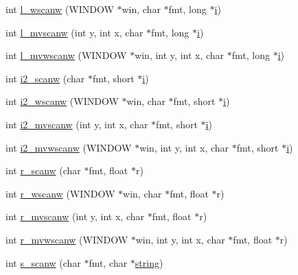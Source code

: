 \begin{DoxyCompactItemize}
\item 
int \hyperlink{C-macros_8c_ae2aa5264dfbd2042fa25e8e70bb445fe}{l\+\_\+wscanw} (W\+I\+N\+D\+OW $\ast$win, char $\ast$fmt, long $\ast$\hyperlink{intro__blas1_83_8txt_a8ba82a50c0c2c12d5f6a77f7e4651c0b}{i})
\item 
int \hyperlink{C-macros_8c_a27ab41c1f51bd6ad8029350446a577ea}{l\+\_\+mvscanw} (int y, int x, char $\ast$fmt, long $\ast$\hyperlink{intro__blas1_83_8txt_a8ba82a50c0c2c12d5f6a77f7e4651c0b}{i})
\item 
int \hyperlink{C-macros_8c_afd4ce2c83673e3073a46a6c0e05b235b}{l\+\_\+mvwscanw} (W\+I\+N\+D\+OW $\ast$win, int y, int x, char $\ast$fmt, long $\ast$\hyperlink{intro__blas1_83_8txt_a8ba82a50c0c2c12d5f6a77f7e4651c0b}{i})
\item 
int \hyperlink{C-macros_8c_ad51e0ab478b4039b3191e38e31ee0676}{i2\+\_\+scanw} (char $\ast$fmt, short $\ast$\hyperlink{intro__blas1_83_8txt_a8ba82a50c0c2c12d5f6a77f7e4651c0b}{i})
\item 
int \hyperlink{C-macros_8c_a44593e3cd853674d1c25ad8295a5e7d2}{i2\+\_\+wscanw} (W\+I\+N\+D\+OW $\ast$win, char $\ast$fmt, short $\ast$\hyperlink{intro__blas1_83_8txt_a8ba82a50c0c2c12d5f6a77f7e4651c0b}{i})
\item 
int \hyperlink{C-macros_8c_ac3ddc9a07837b44a0d66ef085f764609}{i2\+\_\+mvscanw} (int y, int x, char $\ast$fmt, short $\ast$\hyperlink{intro__blas1_83_8txt_a8ba82a50c0c2c12d5f6a77f7e4651c0b}{i})
\item 
int \hyperlink{C-macros_8c_aa6f3d74bf85893265213c40cb5b732e6}{i2\+\_\+mvwscanw} (W\+I\+N\+D\+OW $\ast$win, int y, int x, char $\ast$fmt, short $\ast$\hyperlink{intro__blas1_83_8txt_a8ba82a50c0c2c12d5f6a77f7e4651c0b}{i})
\item 
int \hyperlink{C-macros_8c_ae894ccf3428f2f98a5a10a654b34180a}{r\+\_\+scanw} (char $\ast$fmt, float $\ast$r)
\item 
int \hyperlink{C-macros_8c_a8e85ec34aaf96f801923ac941e9435c4}{r\+\_\+wscanw} (W\+I\+N\+D\+OW $\ast$win, char $\ast$fmt, float $\ast$r)
\item 
int \hyperlink{C-macros_8c_a63197ac5eb05fa04cb88458e24ba8b98}{r\+\_\+mvscanw} (int y, int x, char $\ast$fmt, float $\ast$r)
\item 
int \hyperlink{C-macros_8c_a7db28527589679384ae2e79c665eddb4}{r\+\_\+mvwscanw} (W\+I\+N\+D\+OW $\ast$win, int y, int x, char $\ast$fmt, float $\ast$r)
\item 
int \hyperlink{C-macros_8c_a1e1dafd3d6cad8ea2d5f8609c242066e}{s\+\_\+scanw} (char $\ast$fmt, char $\ast$\hyperlink{what__overview_81_8txt_a7d189cc480786c3c65688ced463aedcb}{string})

\end{DoxyCompactItemize}
